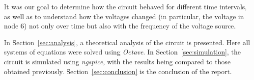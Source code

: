 
It was our goal to determine how the circuit behaved for different time intervals, as well as to understand how the voltages changed (in particular, the voltage in node 6) not only over time but also with the frequency of the voltage source.

In Section~\ref{sec:analysis}, a theoretical analysis of the circuit is presented. Here all systems of equations were solved using \textit{Octave}. In Section~\ref{sec:simulation}, the circuit is simulated using \textit{ngspice}, with the results being compared to those obtained previously. Section~\ref{sec:conclusion} is the conclusion of the report. %


